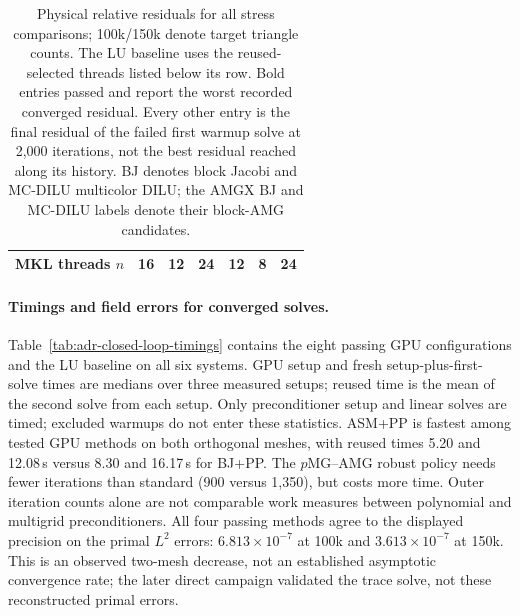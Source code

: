 \begin{table}[htbp]
\begin{tabular}{@{}lrrrrrr@{}}
  MKL threads $n$ & 16 & 12 & 24 & 12 & 8 & 24\\
  \bottomrule
 \end{tabular}
 \caption{Physical relative residuals for all stress comparisons; 100k/150k
 denote target triangle counts. The LU baseline uses the reused-selected
 threads listed below its row. Bold entries passed and report the worst
 recorded converged residual. Every other entry is the final residual of
 the failed first warmup solve at 2,000 iterations, not the best residual
 reached along its history. BJ denotes block Jacobi and MC-DILU multicolor
 DILU; the AMGX BJ and MC-DILU labels denote their block-AMG candidates.}
 \label{tab:adr-closed-loop-residuals}
\end{table}

\paragraph{Timings and field errors for converged solves.}
Table~\ref{tab:adr-closed-loop-timings} contains the eight passing GPU
configurations and the LU baseline on all six systems. GPU setup and
fresh setup-plus-first-solve times are medians
over three measured setups; reused time is the mean of the second solve
from each setup. Only preconditioner setup and linear solves are timed;
excluded warmups do not enter these statistics.
ASM+PP is fastest among tested GPU methods on both orthogonal meshes, with reused times 5.20 and
12.08\,s versus 8.30 and 16.17\,s for BJ+PP. The $p$MG--AMG robust policy
needs fewer iterations than standard (900 versus 1,350), but costs more
time. Outer iteration counts alone are not comparable work measures
between polynomial and multigrid preconditioners.
All four passing methods agree to the displayed precision on the primal
$L^2$ errors: $6.813\times10^{-7}$ at 100k and $3.613\times10^{-7}$ at
150k. This is an observed two-mesh decrease, not an established
asymptotic convergence rate; the later direct campaign validated the
trace solve, not these reconstructed primal errors.

